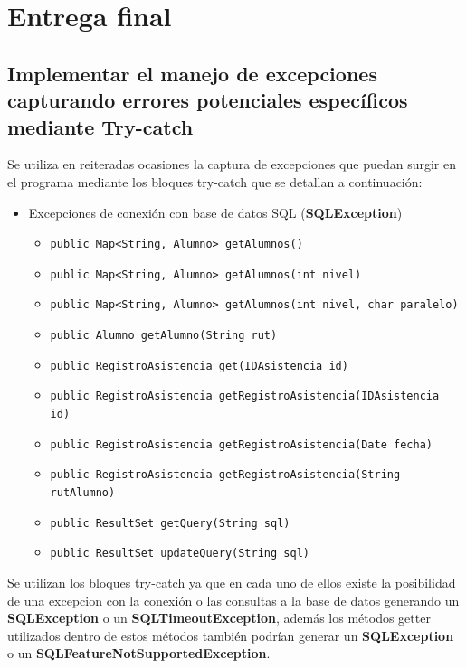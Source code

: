 \renewcommand\thesection{\Alph{section}}
\renewcommand\thesubsection{\thesection.\arabic{subsection}}
\setcounter{section}{5}
\section{Entrega final}

\setcounter{subsection}{1}
\subsection{Implementar el manejo de excepciones capturando errores potenciales específicos mediante Try-catch}

Se utiliza en reiteradas ocasiones la captura de excepciones que puedan surgir en el programa mediante los bloques try-catch que se detallan a continuación:

\begin{itemize}
    \item Excepciones de conexión con base de datos SQL (\textbf{SQLException})
    \begin{itemize}
        \item \texttt{public Map<String, Alumno> getAlumnos()}
        \item \texttt{public Map<String, Alumno> getAlumnos(int nivel)}
        \item \texttt{public Map<String, Alumno> getAlumnos(int nivel, char paralelo)}
        \item \texttt{public Alumno getAlumno(String rut)}
        \item \texttt{public RegistroAsistencia get(IDAsistencia id)}
        \item \texttt{public RegistroAsistencia getRegistroAsistencia(IDAsistencia id)}
        \item \texttt{public RegistroAsistencia getRegistroAsistencia(Date fecha)}
        \item \texttt{public RegistroAsistencia getRegistroAsistencia(String rutAlumno)}
        \item \texttt{public ResultSet getQuery(String sql)}
        \item \texttt{public ResultSet updateQuery(String sql)}
    \end{itemize}
\end{itemize}

Se utilizan los bloques try-catch ya que en cada uno de ellos existe la posibilidad de una excepcion con la conexión o las consultas a la base de datos generando un \textbf{SQLException} o un \textbf{SQLTimeoutException}, además los métodos getter utilizados dentro de estos métodos también podrían generar un \textbf{SQLException} o un \textbf{SQLFeatureNotSupportedException}.\\

